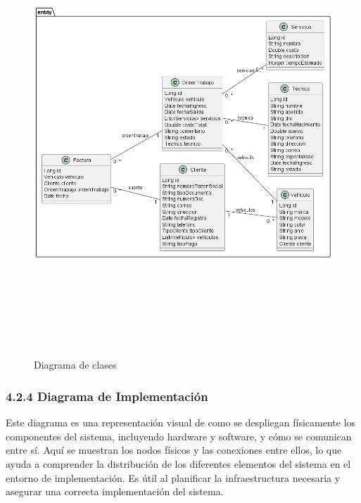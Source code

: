 \begin{landscape}
    \begin{figure}
        \caption{Diagrama de clases}
        \includegraphics[width=22cm, height=16cm]{imagenes/cap4/ClaseInfoEntidad.png}
        \label{fig:Dclases}
    \end{figure}
\end{landscape}


\subsubsection*{4.2.4 Diagrama de Implementación}
Este diagrama es una representación visual de como se despliegan físicamente los componentes del sistema, incluyendo hardware y software, y cómo se comunican entre sí. Aquí se muestran los nodos físicos y las conexiones entre ellos, lo que ayuda a comprender la distribución de los diferentes elementos del sistema en el entorno de implementación. Es útil al planificar la infraestructura necesaria y asegurar una correcta implementación del sistema.

